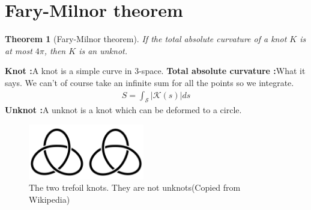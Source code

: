 \documentclass[oneside]{book}\twocolumn
\newtheorem{theorem}{Theorem}
\begin{document}
\section{Fary-Milnor theorem}
\begin{theorem}[Fary-Milnor theorem]
If the total absolute curvature of a knot $K$ is at most $4\pi$, then $K$ is an unknot.
\end{theorem}
\textbf{Knot :}A knot is a simple curve in 3-space. 
\textbf{Total absolute curvature :}What it says. We can't of course take an infinite sum for all the points so we integrate. 
\begin{align}
    S=\int_\mathcal{S}\left|\mathcal{K}(s)\right|ds
\end{align}
\textbf{Unknot :}A unknot is a knot which can be deformed to a circle.
\begin{figure}[!htb]
    \centering
    \includegraphics[width=0.45\textwidth]{The_two_trefoil_knots.png}
    \caption{The two trefoil knots. They are not unknots(Copied from Wikipedia)}
    \label{fig:my_label}
\end{figure}
\end{document}
